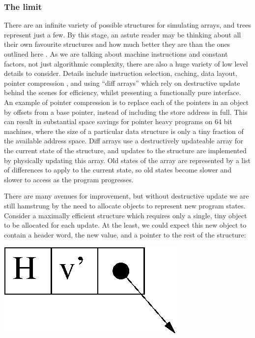 \subsubsection{The limit}
There are an infinite variety of possible structures for simulating arrays, and trees represent just a few. By this stage, an astute reader may be thinking about all their own favourite structures and how much better they are than the ones outlined here \cite{okasaki:pure-data, okasaki:intmaps}. As we are talking about machine instructions and constant factors, not just algorithmic complexity, there are also a huge variety of low level details to consider. Details include instruction selection, caching, data layout, pointer compression \cite{lattner:pointer-compression}, and using ``diff arrays'' which rely on destructive update behind the scenes for efficiency, whilst presenting a functionally pure interface. An example of pointer compression is to replace each of the pointers in an object by offsets from a base pointer, instead of including the store address in full. This can result in substantial space savings for pointer heavy programs on 64 bit machines, where the size of a particular data structure is only a tiny fraction of the available address space. Diff arrays use a destructively updateable array for the current state of the structure, and updates to the structure are implemented by physically updating this array. Old states of the array are represented by a list of differences to apply to the current state, so old states become slower and slower to access as the program progresses.

There are many avenues for improvement, but without destructive update we are still hamstrung by the need to allocate objects to represent new program states. Consider a maximally efficient structure which requires only a single, tiny object to be allocated for each update. At the least, we could expect this new object to contain a header word, the new value, and a pointer to the rest of the structure: 

\begin{center}
\includegraphics[scale=0.5]{1-Introduction/fig/destructive/data-tiny}
\end{center}

